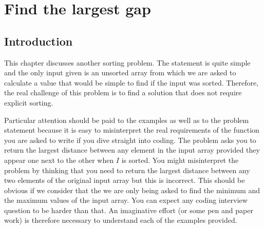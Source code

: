 


\chapter{Find the largest gap}
\label{ch:max_gap}
\section*{Introduction}
This chapter discusses another sorting problem. The statement is quite simple and
the only input given is an unsorted array from which we are asked to calculate a value that would be
simple to find if the input was sorted. Therefore, the real challenge of this problem is to find
a solution that does not require explicit sorting.

Particular attention should be paid to the examples as well as to the problem statement because it
is easy to misinterpret the real requirements of the function you are asked to write if you dive
straight into coding. The problem asks you to return the largest distance between any element in
the input array provided they appear one next to the other when $I$ is sorted. You might
misinterpret the problem by thinking that you need to return the largest distance between any two
elements of the original input array but this is incorrect. This should be obvious if we consider that the we are only being asked to find the minimum and the maximum values of the input array. You can expect any coding interview question to
be harder than that. An imaginative effort (or some pen and paper work) is therefore necessary to
understand each of the examples provided.

